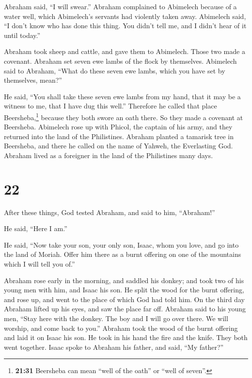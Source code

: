  Abraham said, ``I will swear.''  Abraham
complained to Abimelech because of a water well, which Abimelech's
servants had violently taken away.  Abimelech said, ``I
don't know who has done this thing. You didn't tell me, and I didn't
hear of it until today.''

 Abraham took sheep and cattle, and gave them to
Abimelech. Those two made a covenant.  Abraham set seven
ewe lambs of the flock by themselves.  Abimelech said to
Abraham, ``What do these seven ewe lambs, which you have set by
themselves, mean?''

 He said, ``You shall take these seven ewe lambs from my
hand, that it may be a witness to me, that I have dug this well.''
 Therefore he called that place Beersheba,\footnote{\textbf{21:31}
  Beersheba can mean ``well of the oath'' or ``well of seven''.} because
they both swore an oath there.  So they made a covenant
at Beersheba. Abimelech rose up with Phicol, the captain of his army,
and they returned into the land of the Philistines. 
Abraham planted a tamarisk tree in Beersheba, and there he called on the
name of Yahweh, the Everlasting God.  Abraham lived as a
foreigner in the land of the Philistines many days.

\hypertarget{section-21}{%
\section{22}\label{section-21}}

 After these things, God tested Abraham, and said to him,
``Abraham!''

He said, ``Here I am.''

 He said, ``Now take your son, your only son, Isaac, whom
you love, and go into the land of Moriah. Offer him there as a burnt
offering on one of the mountains which I will tell you of.''

 Abraham rose early in the morning, and saddled his
donkey; and took two of his young men with him, and Isaac his son. He
split the wood for the burnt offering, and rose up, and went to the
place of which God had told him.  On the third day Abraham
lifted up his eyes, and saw the place far off.  Abraham
said to his young men, ``Stay here with the donkey. The boy and I will
go over there. We will worship, and come back to you.'' 
Abraham took the wood of the burnt offering and laid it on Isaac his
son. He took in his hand the fire and the knife. They both went
together.  Isaac spoke to Abraham his father, and said,
``My father?''

